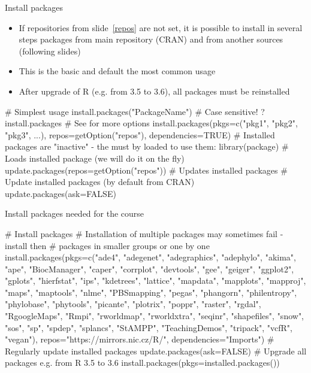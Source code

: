 \documentclass[compress, ucs, xelatex, 11pt, xcolor=svgnames, aspectratio=169,
	hyperref={
		bookmarks=true,
		unicode=true,
		colorlinks=true,
		pdftitle={Molecular data in R},
		plainpages=false,
		pdfauthor={Vojtech Zeisek},
		pdfsubject={Course about phylogeny and evolution in R},
		pdfcreator={XeLaTeX},
		pdfkeywords={R, evolution, phylogeny, molecular data},
		linkcolor=Crimson, %
		anchorcolor=Magenta, %
		citecolor=Magenta, %
		filecolor=Magenta, %
		menucolor=Magenta, %
		urlcolor=DodgerBlue, %
		pdftex},
	url={hyphens, lowtilde} %
	]{beamer}
\begin{document}
\begin{frame}[fragile]{Install packages}
	\begin{itemize}
		\item If repositories from slide~\ref{repos} are not set, it is possible to install in several steps packages from main repository (CRAN) and from another sources (following slides)
		\item This is the basic and default the most common usage
		\item After upgrade of R (e.g. from 3.5 to 3.6), all packages must be reinstalled
	\end{itemize}
	\begin{spluscode}
    # Simplest usage
    install.packages("PackageName") # Case sensitive!
    ?install.packages # See for more options
    install.packages(pkgs=c("pkg1", "pkg2", "pkg3", ...),
      repos=getOption("repos"), dependencies=TRUE)
    # Installed packages are "inactive" - the must by loaded to use them:
    library(package) # Loads installed package (we will do it on the fly)
    update.packages(repos=getOption("repos")) # Updates installed packages
    # Update installed packages (by default from CRAN)
    update.packages(ask=FALSE)
	\end{spluscode}
\end{frame}

\begin{frame}[fragile]{Install packages needed for the course}
	\begin{spluscode}
    # Install packages
    # Installation of multiple packages may sometimes fail - install then
    # packages in smaller groups or one by one
    install.packages(pkgs=c("ade4", "adegenet", "adegraphics", "adephylo",
      "akima", "ape", "BiocManager", "caper", "corrplot", "devtools",
      "gee", "geiger", "ggplot2", "gplots", "hierfstat", "ips", "kdetrees",
      "lattice", "mapdata", "mapplots", "mapproj", "maps", "maptools",
      "nlme", "PBSmapping", "pegas", "phangorn", "philentropy", "phylobase",
      "phytools", "picante", "plotrix", "poppr", "raster", "rgdal",
      "RgoogleMaps", "Rmpi", "rworldmap",  "rworldxtra", "seqinr",
      "shapefiles", "snow", "sos", "sp", "spdep", "splancs", "StAMPP",
      "TeachingDemos", "tripack", "vcfR", "vegan"),
      repos="https://mirrors.nic.cz/R/", dependencies="Imports")
    # Regularly update installed packages
    update.packages(ask=FALSE)
    # Upgrade all packages e.g. from R 3.5 to 3.6
    install.packages(pkgs=installed.packages())
	\end{spluscode}
\end{frame}
\end{document}
